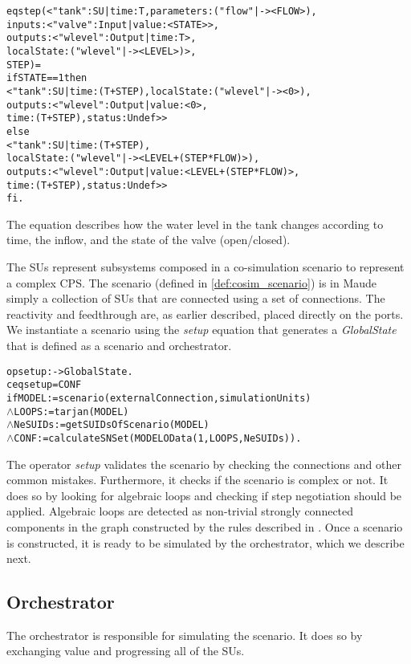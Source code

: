 \begin{alltt}
  \small
  eq step(< "tank" : SU | time : T, parameters : ("flow" |-> < FLOW >), 
                      inputs : < "valve" : Input | value : < STATE > >, 
                      outputs : < "wlevel" : Output | time : T >,
                      localState : ( "wlevel" |-> < LEVEL > ) >,
                      STEP) = 
  if STATE == 1 then 
      < "tank" : SU | time:(T+STEP), localState : ( "wlevel" |-> < 0 > ),
      outputs : < "wlevel" : Output | value : < 0 >, 
      time : (T + STEP), status : Undef > >
    else 
      < "tank" : SU | time : (T + STEP), 
      localState : ( "wlevel" |-> < LEVEL + (STEP * FLOW) > ), 
      outputs :< "wlevel" : Output|value : < LEVEL + (STEP * FLOW) >, 
      time : (T + STEP), status : Undef > > 
  fi .
\end{alltt}

The equation describes how the water level in the tank changes according to time, the inflow, and the state of the valve (open/closed).

The SUs represent subsystems composed in a co-simulation scenario to represent a complex CPS.
The scenario (defined in \cref{def:cosim_scenario}) is in Maude simply a collection of SUs that are connected using a set of connections.
The reactivity and feedthrough are, as earlier described, placed directly on the ports.
We instantiate a scenario using the \emph{setup} equation that generates a \emph{GlobalState} that is defined as a scenario and orchestrator.
\begin{alltt}
  \small
  op setup : -> GlobalState .
  ceq setup = { CONF }
    if MODEL := scenario(externalConnection, simulationUnits)
    \(\land\) LOOPS := tarjan(MODEL)
    \(\land\) NeSUIDs := getSUIDsOfScenario(MODEL)
    \(\land\) CONF := calculateSNSet(MODEL OData(1,LOOPS, NeSUIDs)) .
\end{alltt}

The operator \emph{setup} validates the scenario by checking the connections and other common mistakes.
Furthermore, it checks if the scenario is complex or not.
It does so by looking for algebraic loops and checking if step negotiation should be applied.
Algebraic loops are detected as non-trivial strongly connected components in the graph constructed by the rules described in \cite{Gomes2019c}. 
Once a scenario is constructed, it is ready to be simulated by the orchestrator, which we describe next. 

\subsection{Orchestrator}
The orchestrator is responsible for simulating the scenario.
It does so by exchanging value and progressing all of the SUs.

